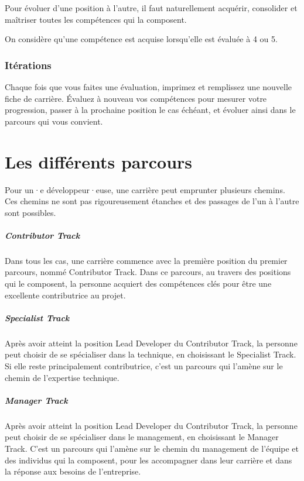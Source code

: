 \documentclass[a4paper, french, openany, 12pt]{book}
\newcommand{\fullwidthimage}[1]{
  \begin{center}
    \makebox[\textwidth]{\texttt{[image: \#1]}}
  \end{center}
}
\newcommand\dev{développeur·euse}
\begin{document}
\begin{multicols}{2}
  Pour évoluer d'une position à l'autre, il faut naturellement acquérir, consolider et maîtriser toutes les compétences
  qui la composent.

  On considère qu'une compétence est acquise lorsqu'elle est évaluée à 4 ou 5.

  \section*{Itérations}

  Chaque fois que vous faites une évaluation, imprimez et remplissez une nouvelle fiche de carrière.
  Évaluez à nouveau vos compétences pour mesurer votre progression, passer à la prochaine position le cas échéant,
  et évoluer ainsi dans le parcours qui vous convient.

\end{multicols}

\part{Les différents parcours}

\fullwidthimage{images/tracks.png}

\begin{multicols}{2}
  Pour un·e \dev, une carrière peut emprunter plusieurs chemins.
  Ces chemins ne sont pas rigoureusement étanches et des passages de l'un à l'autre sont possibles.

  \subsubsection*{Contributor Track}

  Dans tous les cas, une carrière commence avec la première position du premier parcours, nommé Contributor Track.
  Dans ce parcours, au travers des positions qui le composent, la personne acquiert des compétences clés pour être une
  excellente contributrice au projet.

  \subsubsection*{Specialist Track}

  Après avoir atteint la position Lead Developer du Contributor Track, la personne peut choisir de se spécialiser 
  dans la technique, en choisissant le Specialist Track.
  Si elle reste principalement contributrice, c'est un parcours qui l'amène sur le chemin de l'expertise technique.

  \subsubsection*{Manager Track}

  Après avoir atteint la position Lead Developer du Contributor Track, la personne peut choisir de se spécialiser 
  dans le management, en choisissant le Manager Track.
  C'est un parcours qui l'amène sur le chemin du management de l'équipe et des individus qui la composent, pour les
  accompagner dans leur carrière et dans la réponse aux besoins de l'entreprise.

\end{multicols}
\end{document}
